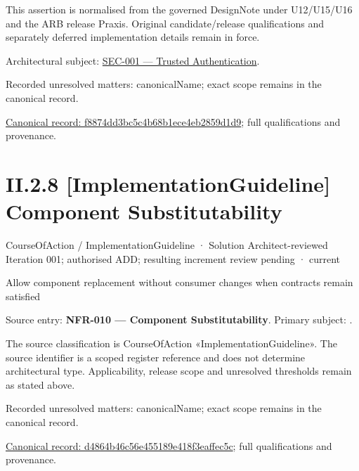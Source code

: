 This assertion is normalised from the governed DesignNote under U12/U15/U16 and the ARB release Praxis. Original candidate/release qualifications and separately deferred implementation details remain in force.



Architectural subject: \hyperref[element:e4998b0a132c41afbe610b11869c3297]{SEC-001 — Trusted Authentication}.


{\small Recorded unresolved matters: canonicalName; exact scope remains in the canonical record.}\par
{\footnotesize \href{../../../../../../../continuum/strategy/course-of-action/implementation-guideline/f8874dd3bc5c4b68b1ece4eb2859d1d9.md}{Canonical record: f8874dd3bc5c4b68b1ece4eb2859d1d9}; full qualifications and provenance.}\par
\section*{II.2.8 [ImplementationGuideline] Component Substitutability}
\label{navigation:II.2.8}

\label{element:d4864b46c56e455189e418f3eaffec5c}
{\small CourseOfAction / ImplementationGuideline · Solution Architect-reviewed Iteration 001; authorised ADD; resulting increment review pending · current}\par

Allow component replacement without consumer changes when contracts remain satisfied



Source entry: \textbf{NFR-010 — Component Substitutability}. Primary subject: \texttt{}.



The source classification is CourseOfAction «ImplementationGuideline». The source identifier is a scoped register reference and does not determine architectural type. Applicability, release scope and unresolved thresholds remain as stated above.


{\small Recorded unresolved matters: canonicalName; exact scope remains in the canonical record.}\par
{\footnotesize \href{../../../../../../../continuum/strategy/course-of-action/implementation-guideline/d4864b46c56e455189e418f3eaffec5c.md}{Canonical record: d4864b46c56e455189e418f3eaffec5c}; full qualifications and provenance.}\par
